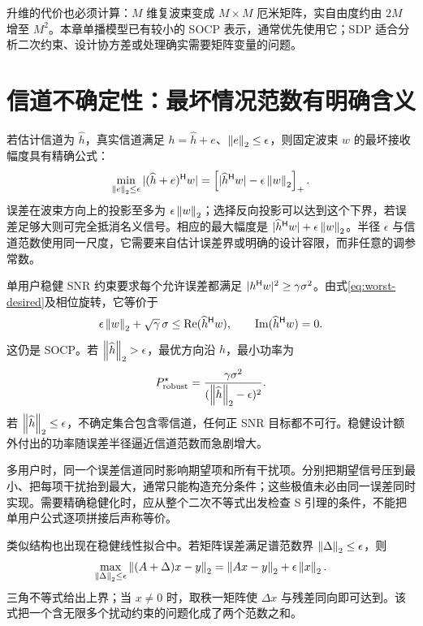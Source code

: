 升维的代价也必须计算：$M$ 维复波束变成 $M\times M$ 厄米矩阵，实自由度约由 $2M$ 增至 $M^2$。本章单播模型已有较小的 SOCP 表示，通常优先使用它；SDP 适合分析二次约束、设计协方差或处理确实需要矩阵变量的问题。

\section{信道不确定性：最坏情况范数有明确含义}
若估计信道为 $\widehat h$，真实信道满足
$h=\widehat h+e$、$\left\lVert e\right\rVert_2\leq\epsilon$，则固定波束 $w$ 的最坏接收幅度具有精确公式：
\begin{equation}
 \min_{\left\lVert e\right\rVert_2\leq\epsilon}|(\widehat h+e)^\mathsf H w|
 =\left[|\widehat h^\mathsf H w|-\epsilon\left\lVert w\right\rVert_2\right]_+.
 \label{eq:worst-desired}
\end{equation}
误差在波束方向上的投影至多为 $\epsilon\left\lVert w\right\rVert_2$；选择反向投影可以达到这个下界，若误差足够大则可完全抵消名义信号。相应的最大幅度是
$|\widehat h^\mathsf H w|+\epsilon\left\lVert w\right\rVert_2$。半径 $\epsilon$ 与信道范数使用同一尺度，它需要来自估计误差界或明确的设计容限，而非任意的调参常数\cite{ben2009}。

单用户稳健 SNR 约束要求每个允许误差都满足
$|h^\mathsf H w|^2\geq\gamma\sigma^2$。由式\eqref{eq:worst-desired}及相位旋转，它等价于
\begin{equation}
 \epsilon\left\lVert w\right\rVert_2+\sqrt\gamma\,\sigma\leq\operatorname{Re}(\widehat h^\mathsf H w),
 \qquad\operatorname{Im}(\widehat h^\mathsf H w)=0.
 \label{eq:robust-soc}
\end{equation}
这仍是 SOCP。若 $\left\lVert \widehat h\right\rVert_2>\epsilon$，最优方向沿 $\widehat h$，最小功率为
\begin{equation}
 P^\star_{\rm robust}
 =\frac{\gamma\sigma^2}{(\left\lVert \widehat h\right\rVert_2-\epsilon)^2}.
 \label{eq:robust-power}
\end{equation}
若 $\left\lVert \widehat h\right\rVert_2\leq\epsilon$，不确定集合包含零信道，任何正 SNR 目标都不可行。稳健设计额外付出的功率随误差半径逼近信道范数而急剧增大。

多用户时，同一个误差信道同时影响期望项和所有干扰项。分别把期望信号压到最小、把每项干扰抬到最大，通常只能构造充分条件；这些极值未必由同一误差同时实现。需要精确稳健化时，应从整个二次不等式出发检查 S 引理的条件，不能把单用户公式逐项拼接后声称等价。

类似结构也出现在稳健线性拟合中。若矩阵误差满足谱范数界 $\left\lVert \Delta\right\rVert_2\leq\epsilon$，则
\begin{equation}
 \max_{\left\lVert \Delta\right\rVert_2\leq\epsilon}\left\lVert (A+\Delta)x-y\right\rVert_2
 =\left\lVert Ax-y\right\rVert_2+\epsilon\left\lVert x\right\rVert_2.
 \label{eq:robust-ls}
\end{equation}
三角不等式给出上界；当 $x\ne0$ 时，取秩一矩阵使 $\Delta x$ 与残差同向即可达到。该式把一个含无限多个扰动约束的问题化成了两个范数之和。

